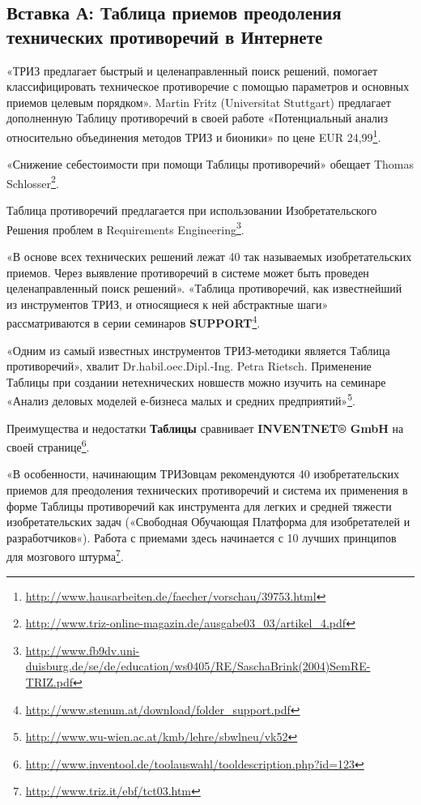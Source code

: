 \documentclass[11pt,a4paper]{article}
\begin{document}
\subsection*{Вставка А: Таблица приемов преодоления технических противоречий в
  Интернете} 

«ТРИЗ предлагает быстрый и целенаправленный поиск решений, помогает
классифицировать техническое противоречие с помощью параметров и основных
приемов целевым порядком». Martin Fritz (Universitat Stuttgart) предлагает
дополненную Таблицу противоречий в своей работе «Потенциальный анализ
относительно объединения методов ТРИЗ и бионики» по цене EUR
24,99\footnote{\url{http://www.hausarbeiten.de/faecher/vorschau/39753.html}}.

«Снижение себестоимости при помощи Таблицы противоречий» обещает Thomas
Schlos\-ser\footnote{\url{http://www.triz-online-magazin.de/ausgabe03_03/artikel_4.pdf}}.

Таблица противоречий предлагается при использовании Изобретательского Решения
проблем в Requirements
Engineering\footnote{\url{http://www.fb9dv.uni-duisburg.de/se/de/education/ws0405/RE/SaschaBrink(2004)SemRE-TRIZ.pdf}}.

«В основе всех технических решений лежат 40 так называемых изобретательских
приемов. Через выявление противоречий в системе может быть проведен
целенаправленный поиск решений». «Таблица противоречий, как известнейший из
инструментов ТРИЗ, и относящиеся к ней абстрактные шаги» рассматриваются в
серии семинаров
\textbf{SUPPORT}\footnote{\url{http://www.stenum.at/download/folder_support.pdf}}.

«Одним из самый известных инструментов ТРИЗ-методики является Таблица
противоречий», хвалит Dr.habil.oec.Dipl.-Ing. Petra Rietsch. Применение
Таблицы при создании нетехнических новшеств можно изучить на семинаре «Анализ
деловых моделей е-бизнеса малых и средних
предприятий»\footnote{\url{http://www.wu-wien.ac.at/kmb/lehre/sbwlneu/vk52}}.

Преимущества и недостатки \textbf{Таблицы} сравнивает \textbf{INVENTNET® GmbH}
на своей
странице\footnote{\url{http://www.inventool.de/toolauswahl/tooldescription.php?id=123}}.

«В особенности, начинающим ТРИЗовцам рекомендуются 40 изобретательских приемов
для преодоления технических противоречий и система их применения в форме
Таблицы противоречий как инструмента для легких и средней тяжести
изобретательских задач («Свободная Обучающая Платформа для изобретателей и
разработчиков«). Работа с приемами здесь начинается с 10 лучших принципов для
мозгового штурма\footnote{\url{http://www.triz.it/ebf/tct03.htm}}.
\end{document}
